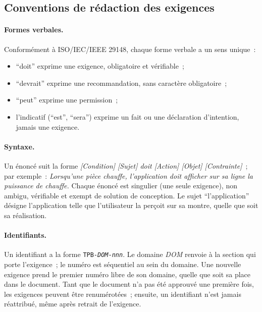 \subsection{Conventions de rédaction des exigences}

\paragraph{Formes verbales.} Conformément à ISO/IEC/IEEE 29148, chaque forme verbale
a un sens unique~:
\begin{itemize}
  \item \enquote{doit} exprime une exigence, obligatoire et vérifiable~;
  \item \enquote{devrait} exprime une recommandation, sans caractère obligatoire~;
  \item \enquote{peut} exprime une permission~;
  \item l'indicatif (\enquote{est}, \enquote{sera}) exprime un fait ou une
        déclaration d'intention, jamais une exigence.
\end{itemize}

\paragraph{Syntaxe.} Un énoncé suit la forme
\textit{[Condition] [Sujet] doit [Action] [Objet] [Contrainte]}~; par exemple~:
\textit{Lorsqu'une pièce chauffe, l'application doit afficher sur sa ligne la puissance de
chauffe.}
Chaque énoncé est singulier (une seule exigence), non ambigu, vérifiable et exempt
de solution de conception. Le sujet \enquote{l'application} désigne l'application telle que
l'utilisateur la perçoit sur sa montre, quelle que soit sa réalisation.

\paragraph{Identifiants.} Un identifiant a la forme \texttt{TPB-\textit{DOM}-\textit{nnn}}.
Le domaine \textit{DOM} renvoie à la section qui porte l'exigence~; le numéro est
séquentiel au sein du domaine. Une nouvelle exigence prend le premier numéro libre de son
domaine, quelle que soit sa place dans le document. Tant que le document n'a pas été
approuvé une première fois, les exigences peuvent être renumérotées~; ensuite, un
identifiant n'est jamais réattribué, même après retrait de l'exigence.

